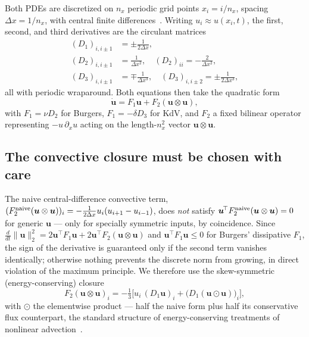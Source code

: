 \documentclass[aps,prx,twocolumn,notitlepage,superscriptaddress,floatfix,10pt]{revtex4-2}
\newcommand{\norm}[1]{\lVert #1 \rVert}
\begin{document}
Both PDEs are discretized on $n_x$ periodic grid points $x_i=i/n_x$, spacing $\Delta x=1/n_x$, with
central finite differences~\cite{Fornberg1988}. Writing $u_i\approx u(x_i,t)$, the first, second, and
third derivatives are the circulant matrices
\begin{align}
(D_1)_{i,i\pm1}&=\pm\tfrac{1}{2\Delta x},\\
(D_2)_{i,i\pm1}&=\tfrac{1}{\Delta x^2},\quad (D_2)_{ii}=-\tfrac{2}{\Delta x^2},\\
(D_3)_{i,i\pm1}&=\mp\tfrac{1}{\Delta x^3},\quad (D_3)_{i,i\pm2}=\pm\tfrac{1}{2\Delta x^3},
\end{align}
all with periodic wraparound. Both equations then take the quadratic form
\begin{equation}
\dot{\bm u} = F_1\bm u + F_2(\bm u\otimes\bm u),
\label{eq:quadratic-ode}
\end{equation}
with $F_1=\nu D_2$ for Burgers, $F_1=-\delta D_3$ for KdV, and $F_2$ a fixed bilinear operator
representing $-u\,\partial_xu$ acting on the length-$n_x^2$ vector $\bm u\otimes\bm u$.

\subsection{The convective closure must be chosen with care}
\label{sec:closure}

The naive central-difference convective term,
$(F_2^{\rm naive}(\bm u\otimes\bm u))_i=-\tfrac{1}{2\Delta x}u_i(u_{i+1}-u_{i-1})$, does \emph{not}
satisfy $\bm u^{\!\top}F_2^{\rm naive}(\bm u\otimes\bm u)=0$ for generic $\bm u$ --- only for specially
symmetric inputs, by coincidence. Since
$\tfrac{d}{dt}\norm{\bm u}_2^2=2\bm u^{\!\top}F_1\bm u+2\bm u^{\!\top}F_2(\bm u\otimes\bm u)$ and
$\bm u^{\!\top}F_1\bm u\le0$ for Burgers' dissipative $F_1$, the sign of the derivative is guaranteed
only if the second term vanishes identically; otherwise nothing prevents the discrete norm from
growing, in direct violation of the maximum principle. We therefore use the skew-symmetric
(energy-conserving) closure
\begin{equation}
F_2(\bm u\otimes\bm u)_i = -\tfrac{1}{3}\Big[u_i\,(D_1\bm u)_i+\big(D_1(\bm u\!\odot\!\bm u)\big)_i\Big],
\label{eq:f2skew}
\end{equation}
with $\odot$ the elementwise product --- half the naive form plus half its conservative flux
counterpart, the standard structure of energy-conserving treatments of nonlinear
advection~\cite{Harten1983,Tadmor1987}.
\end{document}
